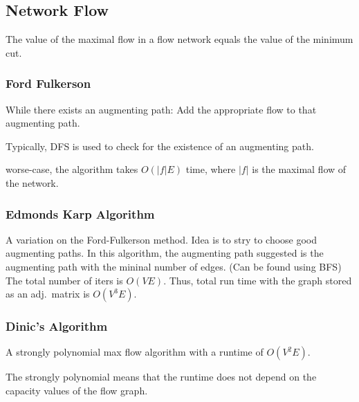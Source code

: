 
\subsection*{Network Flow}

 The value of the maximal flow in a flow network
equals the value of the minimum cut.

\subsubsection*{Ford Fulkerson}
While there exists an augmenting path:
Add the appropriate flow to that augmenting path.

Typically, DFS is used to check for the existence of an augmenting path.

worse-case, the algorithm takes $O(|f|E)$ time, where $|f|$ is the maximal flow  of the network.

\subsubsection*{Edmonds Karp Algorithm}
A variation on the Ford-Fulkerson method. Idea is to stry to choose good augmenting paths.
In this algorithm, the augmenting path suggested is the augmenting path with the mininal
number of edges. (Can be found using BFS) The total number of iters is $O(VE)$. Thus,
total run time with the graph stored as an adj.\ matrix is $O(V^3E)$.


\subsubsection*{Dinic's Algorithm}
A strongly polynomial max flow algorithm with a runtime of $O(V^2E)$.

The strongly polynomial means that the runtime does not depend on the capacity
values of the flow graph.

